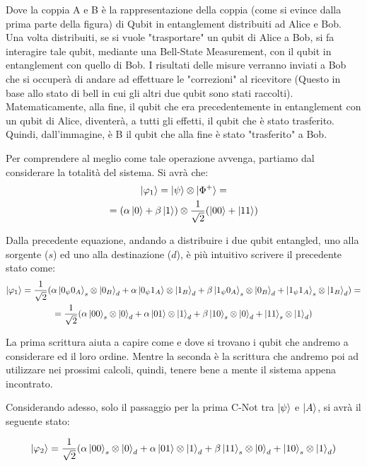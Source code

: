 Dove la coppia A e B è la rappresentazione della coppia (come si evince dalla prima parte della figura) di Qubit in entanglement distribuiti ad Alice e Bob. Una volta distribuiti, se si vuole "trasportare" un qubit di Alice a Bob, si fa interagire tale qubit, mediante una Bell-State Measurement, con il qubit in entanglement con quello di Bob. I risultati delle misure verranno inviati a Bob che si occuperà di andare ad effettuare le "correzioni" al ricevitore (Questo in base allo stato di bell in cui gli altri due qubit sono stati raccolti). Matematicamente, alla fine, il qubit che era precedentemente in entanglement con un qubit di Alice, diventerà, a tutti gli effetti, il qubit che è stato trasferito. Quindi, dall'immagine, è B il qubit che alla fine è stato "trasferito" a Bob.

Per comprendere al meglio come tale operazione avvenga, partiamo dal considerare la totalità del sistema. Si avrà che:
\begin{gather*}
\ket{\varphi_1} = \ket{\psi} \otimes \ket{\Phi^+}=\\
=(\alpha \ket{0} + \beta \ket{1}) \otimes \frac{1}{\sqrt{2}}(\ket{00} + \ket{11})
\end{gather*}

Dalla precedente equazione, andando a distribuire i due qubit entangled, uno alla sorgente (\(s\)) ed uno alla destinazione (\(d\)), è più intuitivo scrivere il precedente stato come:
\begin{gather*}
\ket{\varphi_1} = \frac{1}{\sqrt{2}}(\alpha \ket{0_\psi 0_A}_s \otimes \ket{0_B}_d + \alpha \ket{0_\psi 1_A} \otimes \ket{1_B}_d + \beta \ket{1_\psi 0_A}_s \otimes \ket{0_B}_d +  \ket{1_\psi 1_A}_s \otimes \ket{1_B}_d)=\\
=\frac{1}{\sqrt{2}}(\alpha \ket{0 0}_s \otimes \ket{0}_d + \alpha \ket{0 1} \otimes \ket{1}_d + \beta \ket{1 0}_s \otimes \ket{0}_d +  \ket{1 1}_s \otimes \ket{1}_d)
\end{gather*}

\begin{info}
La prima scrittura aiuta a capire come e dove si trovano i qubit che andremo a considerare ed il loro ordine. Mentre la seconda è la scrittura che andremo poi ad utilizzare nei prossimi calcoli, quindi, tenere bene a mente il sistema appena incontrato.
\end{info}

Considerando adesso, solo il passaggio per la prima C-Not tra \(\ket{\psi}\) e \(\ket{A}\), si avrà il seguente stato:

\begin{gather*}
\ket{\varphi_2} = \frac{1}{\sqrt{2}}(\alpha \ket{0 0}_s \otimes \ket{0}_d + \alpha \ket{0 1} \otimes \ket{1}_d + \beta \ket{1 1}_s \otimes \ket{0}_d +  \ket{1 0}_s \otimes \ket{1}_d)
\end{gather*}

